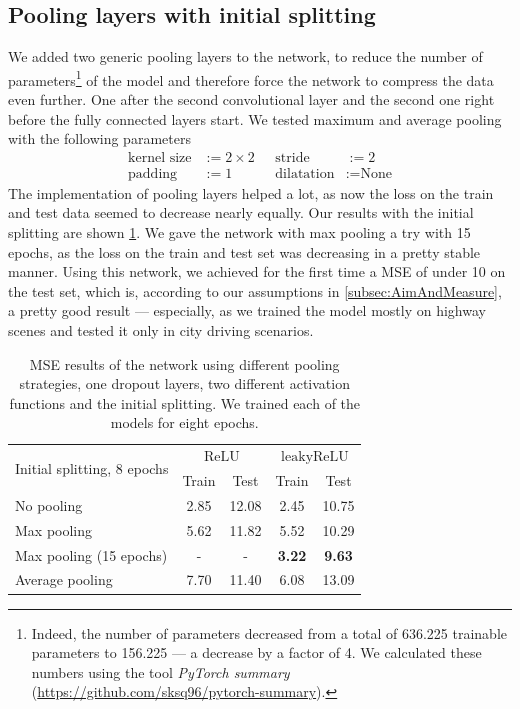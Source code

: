 \documentclass[conference]{IEEEtran}
\begin{document}
\subsection{Pooling layers with initial splitting}
We added two generic pooling layers to the network, to reduce the number of parameters\footnote{Indeed, 
the number of parameters decreased from a total of 636.225 trainable parameters to 156.225 --- a 
decrease by a factor of 4. We calculated these numbers using the tool \emph{PyTorch summary} 
(\url{https://github.com/sksq96/pytorch-summary}).} of the model and 
therefore force the network to compress the data even further. One after the second 
convolutional layer and the second one right before the fully connected layers start.
We tested maximum and average pooling with the following parameters
\begin{align*}
\text{kernel size} &:= 2\times 2 &\text{\ \ \ \ } \text{stride} &:= 2\\
\text{padding} &:= 1 &\text{\ \ \ }\text{dilatation} &:= \text{None}
\end{align*}
The implementation of pooling layers helped a lot, as now the loss on the train and test data seemed to 
decrease nearly equally. Our results with the initial splitting are shown 
\cref{tab:ResultsInitialSplitting}. We gave the network
with max pooling a try with 15 epochs, as the loss on the train and test set was decreasing in a pretty 
stable manner. Using this network, we achieved for the first time a MSE of under 10 on the test set,
which is, according to our assumptions in \cref{subsec:AimAndMeasure}, a 
pretty good result --- especially, as we trained the model mostly on highway scenes and tested it only 
in city driving scenarios.
\begin{table}[!t]
\normalsize
\centering
\begin{tabular}{lcccc}
\toprule
\multirow{2}{*}{Initial splitting, 8 epochs}  & \multicolumn{2}{c}{$\mathrm{ReLU}$} & \multicolumn{2}{c}{$\mathrm{leakyReLU}$} \\
 & Train & Test & Train & Test\\
\midrule
No pooling & 2.85 & 12.08 & 2.45 & 10.75 \\
Max pooling & 5.62 & 11.82 & 5.52 & 10.29 \\
Max pooling (15 epochs) & - & - & \textbf{3.22} & \textbf{9.63} \\
Average pooling & 7.70 & 11.40 & 6.08 & 13.09\\
\bottomrule
\end{tabular}
\caption{MSE results of the network using different pooling strategies, one dropout layers, two different activation functions and 
the initial splitting. We trained each of the models for eight epochs.}
\label{tab:ResultsInitialSplitting}
\end{table} 
\end{document}
